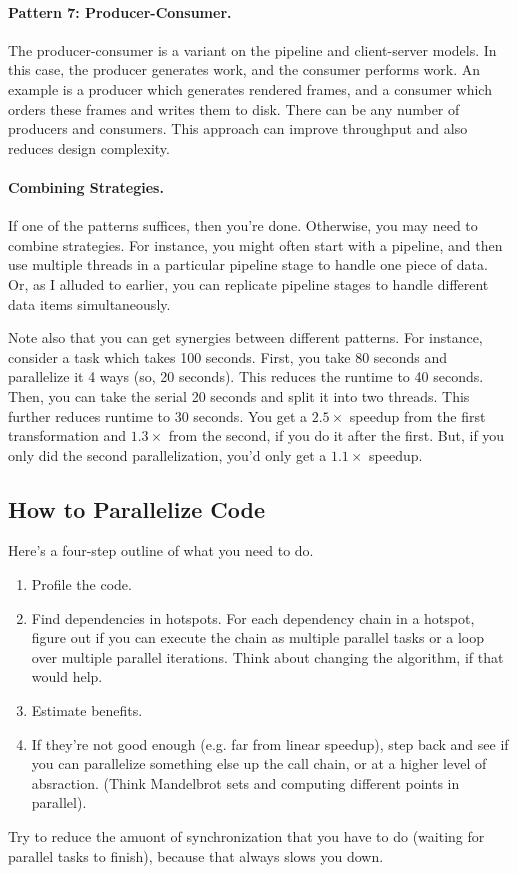 \documentclass[11pt]{article}
\begin{document}
\paragraph{Pattern 7: Producer-Consumer.} The producer-consumer is 
a variant on the pipeline and client-server models. In this case, the
producer generates work, and the consumer performs work. An example is
a producer which generates rendered frames, and a consumer which
orders these frames and writes them to disk. There can be any number
of producers and consumers. This approach can improve throughput
and also reduces design complexity.

\paragraph{Combining Strategies.} If one of the patterns suffices,
then you're done. Otherwise, you may need to combine strategies.
For instance, you might often start with a pipeline, and then 
use multiple threads in a particular pipeline stage to handle one
piece of data. Or, as I alluded to earlier, you can replicate
pipeline stages to handle different data items simultaneously.

Note also that you can get synergies between different patterns.
For instance, consider a task which takes 100 seconds. First, you
take 80 seconds and parallelize it 4 ways (so, 20 seconds). This
reduces the runtime to 40 seconds. Then, you can take the serial 
20 seconds and split it into two threads. This further reduces 
runtime to 30 seconds. You get a $2.5\times$ speedup from the
first transformation and $1.3\times$ from the second, if you do it
after the first. But, if you only did the second parallelization,
you'd only get a $1.1\times$ speedup.

\subsection*{How to Parallelize Code}
Here's a four-step outline of what you need to do.
\begin{enumerate}
\item Profile the code.
\item Find dependencies in hotspots. For each dependency chain in
a hotspot, figure out if you can execute the chain as
multiple parallel tasks or a loop over multiple parallel iterations.
Think about changing the algorithm, if that would help.
\item Estimate benefits. 
\item If they're not good enough (e.g. far from linear speedup),
step back and see if you can parallelize something else up the
call chain, or at a higher level of absraction.
(Think Mandelbrot sets and computing different points in parallel).
\end{enumerate}
Try to reduce the amuont of synchronization that you have to do
(waiting for parallel tasks to finish), because that always slows
you down.
\end{document}
